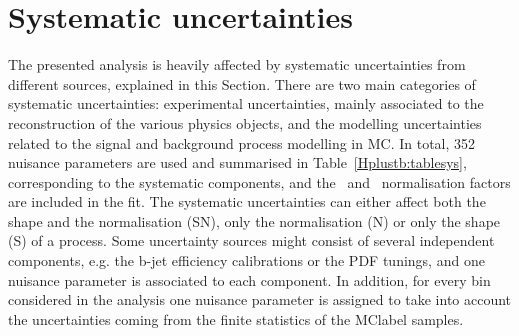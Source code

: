 \section{Systematic uncertainties}
The presented analysis is heavily affected by systematic uncertainties from different sources, explained in this Section. There are two main categories of systematic uncertainties: experimental uncertainties, mainly associated to the reconstruction of the various physics objects, and the modelling uncertainties related to the signal and background process modelling in MC. In total, 352 nuisance parameters are used and summarised in Table~\ref{Hplustb:tablesys}, corresponding to the systematic components, and the \ttb\ and \ttc\ normalisation factors are included in the fit. The systematic uncertainties can either affect both the shape and the normalisation (SN), only the normalisation (N) or only the shape (S) of a process. Some uncertainty sources might consist of several independent components, e.g. the b-jet efficiency calibrations or the PDF tunings, and one nuisance parameter is associated to each component. In addition, for every bin considered in the analysis one nuisance parameter is assigned to take into account the uncertainties coming from the finite statistics of the \acrshort{MClabel} samples.

